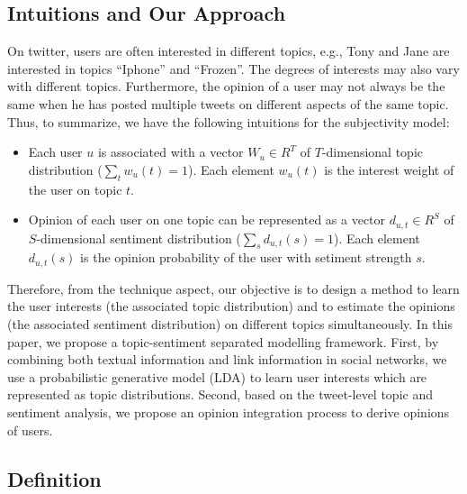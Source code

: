 \documentclass{acm_proc_article-sp}
\begin{document}
\subsection{Intuitions and Our Approach}
\label{framework} 

On twitter, users are often interested in different topics, e.g., Tony and Jane are interested in topics ``Iphone'' and ``Frozen''. The degrees of interests may also vary with different topics. Furthermore, the opinion of a user may not always be the same when he has posted multiple tweets on different aspects of the same topic. Thus, to summarize, we have the following intuitions for the subjectivity model:
\begin{itemize}
\item Each user $ u $ is associated with a vector $ W_{u} \in R^{T} $ of $ T $-dimensional topic distribution ($ \sum_{t}w_{u}(t)=1 $). Each element $ w_{u}(t) $ is the interest weight of the user on topic $ t $.
\item Opinion of each user on one topic can be represented as a vector $ d_{u,t} \in R^{S} $ of $ S $-dimensional sentiment distribution ($ \sum_{s}d_{u,t}(s)=1 $). Each element $ d_{u,t}(s) $ is the opinion probability of the user with setiment strength $ s $.
\end{itemize}

Therefore, from the technique aspect, our objective is to design a method to learn the user interests (the associated topic distribution) and to estimate the opinions (the associated sentiment distribution) on different topics simultaneously. In this paper, we propose a topic-sentiment separated modelling framework. First, by combining both textual information and link information in social networks, we use a probabilistic generative model (LDA) to learn user interests which are represented as topic distributions. Second, based on the tweet-level topic and sentiment analysis, we propose an opinion integration process to derive opinions of users.

\subsection{Definition}
\label{definition}
\end{document}
